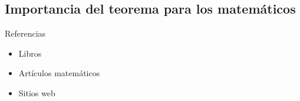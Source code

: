 \documentclass[spanish,utf8]{beamer}
\theoremstyle{definition}
\begin{document}
\subsection{Importancia del teorema para los matemáticos}

\begin{frame}[allowframebreaks]{Referencias}\transblindsvertical
\begin{itemize}
	\item Libros
	\nocite{*}
	\printbibliography[heading=none,keyword=book]
	\item Artículos matemáticos
	\printbibliography[heading=none,keyword=paper]
	\item Sitios web
	\printbibliography[heading=none,keyword=online]
\end{itemize}
\end{frame}
\end{document}
